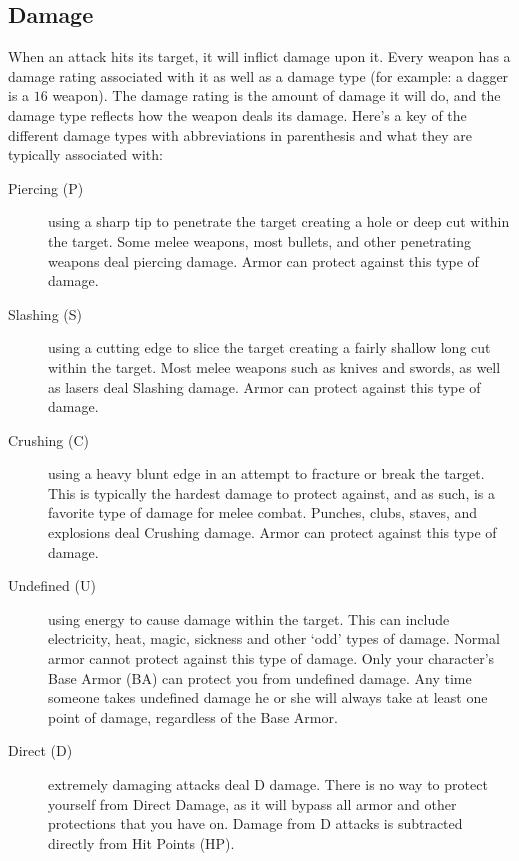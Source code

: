 \documentclass[twoside]{book}
\begin{document}
\subsection{Damage}
     When an attack hits its target, it will inflict
               damage upon it. Every weapon has a damage rating
               associated with it as well as a damage type (for example:
               a dagger is a \ensuremath{1}\ensuremath{6}\textscbf{} weapon). The damage rating is the
               amount of damage it will do, and the damage type reflects
               how the weapon deals its damage.  Here's a key of the different damage types
               with abbreviations in parenthesis and what they are
               typically associated with: 
\begin{description}
    
  \item[ Piercing (P) ]   using a sharp tip to penetrate the target
                   creating a hole or deep cut within the target. Some
                   melee weapons, most bullets, and other penetrating
                   weapons deal piercing damage. Armor can protect
                   against this type of damage. 
  \item[ Slashing (S) ]   using a cutting edge to slice the target
                   creating a fairly shallow long cut within the target.
                   Most melee weapons such as knives and swords, as well
                   as lasers deal Slashing damage. Armor can protect
                   against this type of damage. 
  \item[ Crushing (C) ]   using a heavy blunt edge in an attempt to
                   fracture or break the target. This is typically the
                   hardest damage to protect against, and as such, is a
                   favorite type of damage for melee combat. Punches,
                   clubs, staves, and explosions deal Crushing damage.
                   Armor can protect against this type of damage. 
  \item[ Undefined (U) ]   using energy to cause damage within the target.
                   This can include electricity, heat, magic, sickness
                   and other `odd' types of damage. Normal
                   armor cannot protect against this type of damage. Only
                   your character's Base Armor (BA) can protect you
                   from undefined damage. Any time someone takes
                   undefined damage he or she will always take at least
                   one point of damage, regardless of the Base Armor.
                   
  \item[ Direct (D) ]   extremely damaging attacks deal D damage. There
                   is no way to protect yourself from Direct Damage, as
                   it will bypass all armor and other protections that
                   you have on. Damage from D attacks is subtracted
                   directly from Hit Points (HP). 
\end{description}
\end{document}
